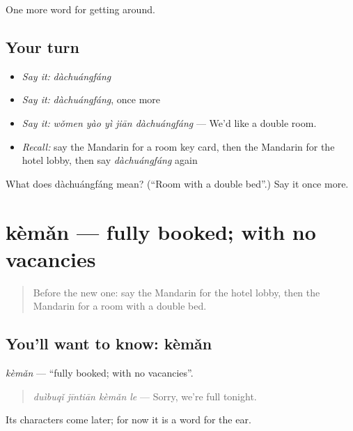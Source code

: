 \begin{grammarlens}[title={What you've built}]
One more word for getting around.
\end{grammarlens}

\subsection*{Your turn}
\begin{itemize}
\raggedright
  \item \emph{Say it:} \emph{dàchuángfáng}
  \item \emph{Say it:} \emph{dàchuángfáng}, once more
  \item \emph{Say it:} \emph{wǒmen yào yì jiān dàchuángfáng} — We'd like a double room.
  \item \emph{Recall:} say the Mandarin for a room key card, then the Mandarin for the hotel lobby, then say \emph{dàchuángfáng} again
\end{itemize}

\begin{tcolorbox}[breakable,colback=teal!4,colframe=teal!35!black,title={Before you move on}]
What does dàchuángfáng mean? (\textquotedblleft{}Room with a double bed\textquotedblright{}.) Say it once more.
\end{tcolorbox}
\section[kèmǎn]{kèmǎn — fully booked; with no vacancies}

\label{lesson:ZH-C426-keman}



\begin{quote}
Before the new one: say the Mandarin for the hotel lobby, then the Mandarin for a room with a double bed.
\end{quote}

\subsection*{You'll want to know: kèmǎn}
\emph{kèmǎn} — \textquotedblleft{}fully booked; with no vacancies\textquotedblright{}.

\begin{quote}
\emph{duìbuqǐ jīntiān kèmǎn le} — Sorry, we're full tonight.
\end{quote}

Its characters come later; for now it is a word for the ear.


